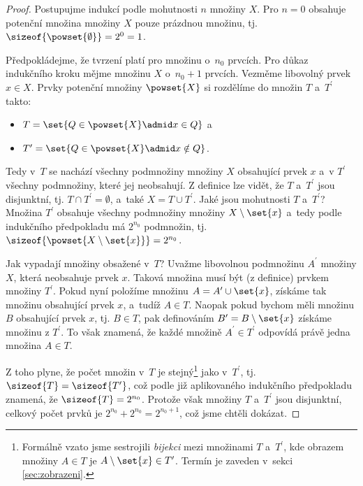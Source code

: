 \begin{proof}
    Postupujme indukcí podle mohutnosti $n$ množiny $X$. Pro $n=0$ obsahuje potenční množina množiny $X$ pouze prázdnou množinu, tj. $\sizeof{\powset{\emptyset}}=2^0=1$.\par
    Předpokládejme, že tvrzení platí pro množinu o~$n_0$ prvcích. Pro důkaz indukčního kroku mějme množinu $X$ o~$n_0+1$ prvcích. Vezměme libovolný prvek $x \in X$. Prvky potenční množiny $\powset{X}$ si rozdělíme do množin $T$ a~$T^\prime$ takto:
    \begin{itemize}
        \item $T=\set{Q \in \powset{X} \admid x\in Q}$ a
        \item $T^\prime=\set{Q \in \powset{X} \admid x\notin Q}$.
    \end{itemize}
    Tedy v~$T$ se nachází všechny podmnožiny množiny $X$ obsahující prvek $x$ a~v $T^\prime$ všechny podmnožiny, které jej neobsahují. Z definice lze vidět, že $T$ a~$T^\prime$ jsou disjunktní, tj. $T \cap T^\prime=\emptyset$, a~také $X=T\cup T^\prime$. Jaké jsou mohutnosti $T$ a~$T^\prime$? Množina $T^\prime$ obsahuje všechny podmnožiny množiny $X\setminus\set{x}$ a~tedy podle indukčního předpokladu má $2^{n_0}$ podmnožin, tj. $\sizeof{\powset{X\setminus\set{x}}}=2^{n_0}$.\par
    Jak vypadají množiny obsažené v~$T$? Uvažme libovolnou podmnožinu $A^\prime$ množiny $X$, která neobsahuje prvek $x$. Taková množina musí být (z definice) prvkem množiny $T^\prime$. Pokud nyní položíme množinu $A=A^\prime\cup \set{x}$, získáme tak množinu obsahující prvek $x$, a~tudíž $A\in T$. Naopak pokud bychom měli množinu $B$ obsahující prvek $x$, tj. $B\in T$, pak definováním $B^\prime=B\setminus \set{x}$ získáme množinu z $T^\prime$. To však znamená, že každé množině $A^\prime\in T^\prime$ odpovídá právě jedna množina $A\in T$.\par
    Z toho plyne, že počet množin v~$T$ je stejný\footnote{Formálně vzato jsme sestrojili \emph{bijekci} mezi množinami $T$ a~$T^\prime$, kde obrazem množiny $A\in T$ je $A\setminus \set{x}\in T^\prime$. Termín je zaveden v~sekci \ref{sec:zobrazeni}.} jako v~$T^\prime$, tj. $\sizeof{T}=\sizeof{T^\prime}$, což podle již aplikovaného indukčního předpokladu znamená, že $\sizeof{T}=2^{n_0}$. Protože však množiny $T$ a~$T^\prime$ jsou disjunktní, celkový počet prvků je $2^{n_0}+2^{n_0}=2^{n_0+1}$, což jsme chtěli dokázat.
\end{proof}